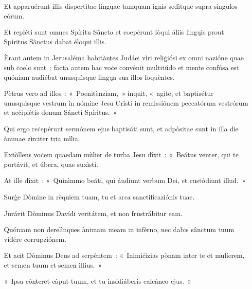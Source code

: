 Et apparuérunt illis dispertítae lingųae tamquam ignis sedìtque supra sìngulos eórum. 

Et repléti sunt omnes Spíritu Sâncto et coepérunt lòqui áliis lingųis prout Spíritus Sânctus dabat éloqui illis. 

Èrant autem in Jerusaléma habitàntes Judáei vìri reliġiósi ex omni nazióne quae sub ċoelo sunt~; facta autem hac voċe convénit multitúdo et mente confúsa est quóniam audiébat unusquìsque lingųa sua illos loquèntes. 

Pètrus vero ad illos~: «~Poenitènziam,~» inquit, «~agite, et baptisétur unusquìsque vestrum in nómine Jesu Crîsti in remissiónem peccatórum vestrórum et acċipiétis donum Sâncti Spíritus.~» 

Qui ergo reċepérunt sermónem ejus baptisáti sunt, et adpòsitae sunt in illa die ànimae zìrciter tria mìlia. 

\mysteryEnd
{}

Extòllens voċem quaedam mùlier de turba Jesu dîxit~: «~Beátus venter, qui te portávit, et úbera, quae suxìsti. 

At ille dîxit~: «~Quinìmmo beáti, qui áudiunt verbum Dei, et custódiunt illud.~» 

Surġe Dòmine in rèquiem tuam, tu et arca sanctificaziónis tuae. 

Jurávit Dòminus Davídi veritátem, et non frustrábitur eam. 

Quóniam non derelìnques ànimam meam in infèrno, nec dabis sânctum tuum vidére corrupziónem. 

Et aeit Dòminus Deus ad serpèntem~: «~Inimiċìzias pònam inter te et mulíerem, et semen tuum et semen ìllius.~» 

«~Ipsa cònteret càput tuum, et tu insidiáberis calcáneo ejus.~» 


